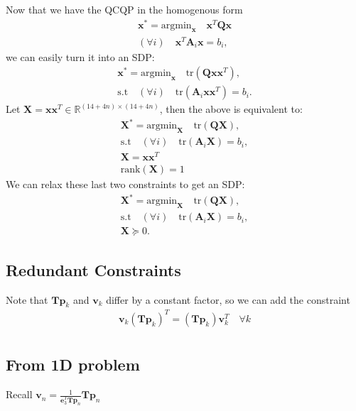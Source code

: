 \documentclass{article}
\newcommand{\mbf}[1]{\mathbf{#1}}
\begin{document}
Now that we have the QCQP in the homogenous form
\begin{align}
\mbf{x}^* = \text{argmin}_{\mbf{x}} \quad \mbf{x}^T \mbf{Q} \mbf{x}\\
(\forall i) \quad \mbf{x}^T \mbf{A}_i \mbf{x} = b_i,
\end{align}
we can easily turn it into an SDP:
\begin{align}
\mbf{x}^* = \text{argmin}_{\mbf{x}} \quad \text{tr}(\mbf{Q}\mbf{x}\mbf{x}^T),\\
\text{s.t}\quad (\forall i) \quad \text{tr}(\mbf{A}_i \mbf{x} \mbf{x}^T) = b_i.
\end{align}
Let $\mbf{X} = \mbf{x}\mbf{x}^T \in \mathbb{R}^{(14 + 4n) \times (14 + 4n)}$, then the above is equivalent to:
\begin{align}
\mbf{X}^* = \text{argmin}_{\mbf{X}} \quad \text{tr}(\mbf{Q}\mbf{X}),\\
\text{s.t}\quad (\forall i) \quad \text{tr}(\mbf{A}_i \mbf{X}) = b_i,\\
\mbf{X} = \mbf{x} \mbf{x}^T\\
\text{rank}(\mbf{X}) = 1
\end{align}
We can relax these last two constraints to get an SDP:
\begin{align}
\mbf{X}^* = \text{argmin}_{\mbf{X}} \quad \text{tr}(\mbf{Q}\mbf{X}),\\
\text{s.t}\quad (\forall i) \quad \text{tr}(\mbf{A}_i \mbf{X}) = b_i,\\
\mbf{X} \succeq 0.
\end{align}

\subsection{Redundant Constraints}

Note that $\mbf{T}\mbf{p}_k$ and $\mbf{v}_k$ differ by a constant factor, so we can add
the constraint
\begin{align}
\mbf{v}_k (\mbf{T} \mbf{p}_k)^T = (\mbf{T} \mbf{p}_k) \mbf{v}_k^T \quad \forall k \\
\end{align}

\subsection{From 1D problem}

Recall $\mbf{v}_n = \frac{1}{\mbf{e}_3^T \mbf{T} \mbf{p}_n} \mbf{T} \mbf{p}_n$
\end{document}
